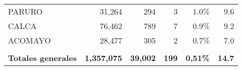 \begin{tabular}{lrrrrr}
	\cellcolor[HTML]{9AFF99}PARURO        & 31,264                                                         & 294                                                                             & 3                                                              & 1.0\%                                                                  & 9.6                                                                                                                                \\
	\cellcolor[HTML]{9AFF99}CALCA         & 76,462                                                         & 789                                                                             & 7                                                              & 0.9\%                                                                  & 9.2                                                                                                                                \\
	\cellcolor[HTML]{9AFF99}ACOMAYO       & 28,477                                                         & 305                                                                             & 2                                                              & 0.7\%                                                                  & 7.0                                                                                                                                \\
	& \multicolumn{1}{l}{}                                           & \multicolumn{1}{l}{}                                                            & \multicolumn{1}{l}{}                                           & \multicolumn{1}{l}{}                                                   & \multicolumn{1}{l}{}                                                                                                               \\
	\rowcolor[HTML]{ECF4FF} 
	\textbf{Totales generales}            & \multicolumn{1}{l}{\cellcolor[HTML]{ECF4FF}\textbf{1,357,075}} & \multicolumn{1}{l}{\cellcolor[HTML]{ECF4FF}\textbf{39,002}}                     & \multicolumn{1}{l}{\cellcolor[HTML]{ECF4FF}\textbf{199}}       & \multicolumn{1}{l}{\cellcolor[HTML]{ECF4FF}\textbf{0,51\%}}            & \multicolumn{1}{l}{\cellcolor[HTML]{ECF4FF}\textbf{14.7}}                                                                         
\end{tabular}